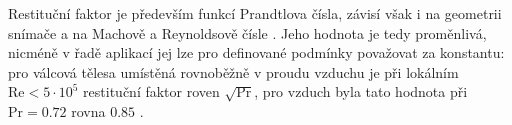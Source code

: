     Restituční faktor je především funkcí Prandtlova čísla, závisí však i na geometrii snímače a na Machově a Reynoldsově čísle \cite{Leontiev2017a}. Jeho hodnota je tedy proměnlivá, nicméně v řadě aplikací jej lze pro definované podmínky považovat za konstantu: pro válcová tělesa umístěná rovnoběžně v proudu vzduchu je při lokálním $\textrm{Re} < 5 \cdot 10^5$ restituční faktor roven $\sqrt{\textrm{Pr}}$, pro vzduch byla tato hodnota při $\textrm{Pr} = 0.72$ rovna $0.85$ \cite{Shapiro1954}. 
